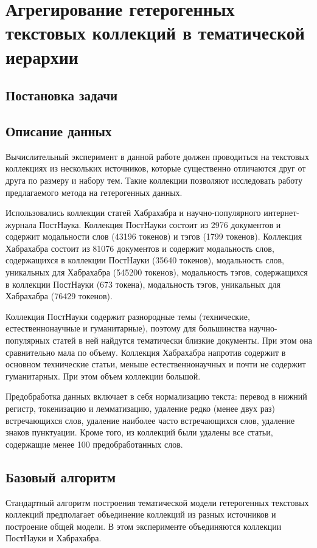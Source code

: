 \chapter{Агрегирование гетерогенных текстовых коллекций в тематической иерархии}
\section{Постановка задачи}
\section{Описание данных}
Вычислительный эксперимент в данной работе должен проводиться на текстовых коллекциях из нескольких источников, которые существенно отличаются друг от друга по размеру и набору тем. Такие коллекции позволяют исследовать работу предлагаемого метода на гетерогенных данных.

 Использовались коллекции статей Хабрахабра и научно-популярного интернет-журнала ПостНаука.
Коллекция ПостНауки состоит из 2976 документов и содержит модальности слов (43196 токенов) и тэгов (1799 токенов). Коллекция Хабрахабра состоит из 81076 документов
и содержит модальность слов, содержащихся в коллекции ПостНауки (35640 токенов), модальность слов, уникальных для Хабрахабра (545200 токенов),
модальность тэгов, содержащихся в коллекции ПостНауки (673 токена), модальность тэгов, уникальных для Хабрахабра (76429 токенов).

Коллекция ПостНауки содержит разнородные темы (технические, естественнонаучные и гуманитарные), поэтому для большинства научно-популярных статей в ней найдутся тематически близкие документы. При этом она сравнительно мала по объему.
Коллекция Хабрахабра напротив содержит в основном технические статьи, меньше естественнонаучных и почти не содержит гуманитарных. При этом объем коллекции большой.

Предобработка данных включает в себя нормализацию текста: перевод в нижний регистр, токенизацию и лемматизацию, удаление редко (менее двух раз) встречающихся слов, удаление наиболее часто встречающихся слов, удаление знаков пунктуации. Кроме того, из коллекций были удалены все статьи, содержащие менее 100 предобработанных слов.
\section{Базовый алгоритм}
Стандартный алгоритм построения тематической модели гетерогенных текстовых коллекций предполагает объединение коллекций из разных источников и построение общей модели. В этом эксперименте объединяются коллекции ПостНауки и Хабрахабра.

